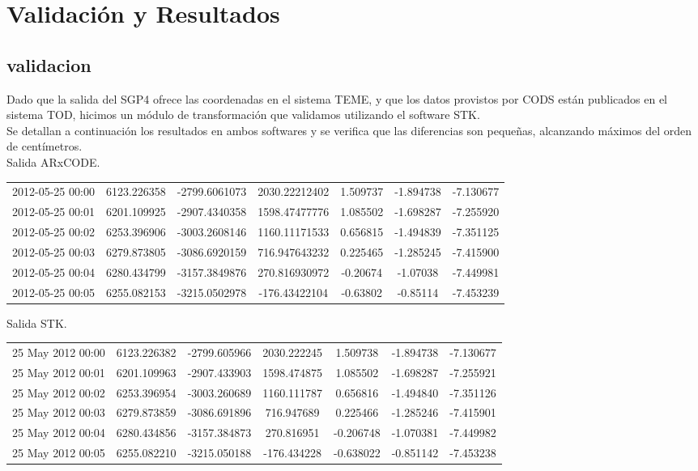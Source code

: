 \chapter{Validaci\'on y Resultados}
\label{chap:resultados}

\section*{validacion}
Dado que la salida del SGP4 ofrece las coordenadas en el sistema TEME, y que los datos provistos
por CODS est\'an publicados en el sistema TOD, hicimos un m\'odulo de transformaci\'on que validamos
utilizando el software STK.\\
Se detallan a continuaci\'on los resultados en ambos softwares y se verifica que las diferencias son peque\~nas, 
alcanzando m\'aximos del orden de cent\'imetros.\\

Salida ARxCODE.\\

\begin{tabular}{lcccccc}
2012-05-25 00:00& 6123.226358& -2799.6061073& 2030.22212402& 1.509737& -1.894738& -7.130677\\
2012-05-25 00:01& 6201.109925& -2907.4340358& 1598.47477776& 1.085502& -1.698287& -7.255920\\
2012-05-25 00:02& 6253.396906& -3003.2608146& 1160.11171533& 0.656815& -1.494839& -7.351125\\
2012-05-25 00:03& 6279.873805& -3086.6920159& 716.947643232& 0.225465& -1.285245& -7.415900\\
2012-05-25 00:04& 6280.434799& -3157.3849876& 270.816930972& -0.20674& -1.07038& -7.449981\\
2012-05-25 00:05& 6255.082153& -3215.0502978& -176.43422104& -0.63802& -0.85114& -7.453239
\end{tabular}

Salida STK.\\

\begin{tabular}{lcccccc}
25 May 2012 00:00& 6123.226382& -2799.605966& 2030.222245& 1.509738& -1.894738& -7.130677\\
25 May 2012 00:01& 6201.109963& -2907.433903& 1598.474875& 1.085502& -1.698287& -7.255921\\
25 May 2012 00:02& 6253.396954& -3003.260689& 1160.111787& 0.656816& -1.494840& -7.351126\\
25 May 2012 00:03& 6279.873859& -3086.691896& 716.947689&  0.225466& -1.285246& -7.415901\\
25 May 2012 00:04& 6280.434856& -3157.384873& 270.816951& -0.206748& -1.070381& -7.449982\\
25 May 2012 00:05& 6255.082210& -3215.050188& -176.434228& -0.638022& -0.851142& -7.453238
\end{tabular}

